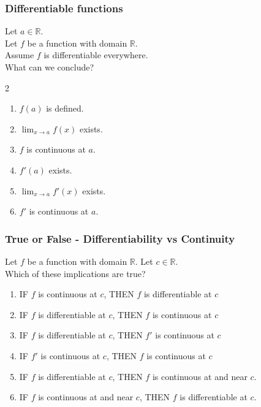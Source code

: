 \documentclass[14pt]{beamer}
\begin{document}
\begin{frame}[t]
	\frametitle{Differentiable functions}

	Let $a \in \mathbb{R}$. \\ Let $f$ be a function with domain $\mathbb{R}$. \\
	Assume $f$ is differentiable everywhere. \\ What can we conclude?

	\begin{multicols}{2}
		\begin{enumerate}
			\item $f(a)$ is defined.

			\item $\displaystyle \lim_{x \to a}f(x)$ exists.

			\item $f$ is continuous at $a$.

			\item $f'(a)$ exists.

			\item $\displaystyle \lim_{x \to a}f'(x)$ exists.

			\item $\displaystyle f'$ is continuous at $a$.
		\end{enumerate}
	\end{multicols}
\end{frame}

\begin{frame}[t]
	\fontsize{13}{13}\selectfont
	\frametitle{True or False - Differentiability vs Continuity}

	Let $f$ be a function with domain $\mathbb{R}$. Let $c \in \mathbb{R}$. \\ Which
	of these implications are true?

	\vfill

	\begin{enumerate}
		\item IF $f$ is {\color{red} continuous} at $c$, THEN $f$ is
			{\color{blue} differentiable} at $c$
			\vfill

		\item IF $f$ is {\color{blue} differentiable} at $c$, THEN $f$ is
			{\color{red} continuous} at $c$
			\vfill

		\item IF $f$ is {\color{blue} differentiable} at $c$, THEN $f'$ is
			{\color{red} continuous} at $c$
			\vfill

		\item IF $f'$ is {\color{red} continuous} at $c$, THEN $f$ is
			{\color{red} continuous} at $c$
			\vfill

		\item IF $f$ is {\color{blue} differentiable} at $c$, THEN $f$ is
			{\color{red} continuous} at and near $c$.
			\vfill

		\item IF $f$ is {\color{red} continuous} at and near $c$, THEN $f$ is
			{\color{blue} differentiable} at $c$.
			\vfill
	\end{enumerate}
\end{frame}
\end{document}
